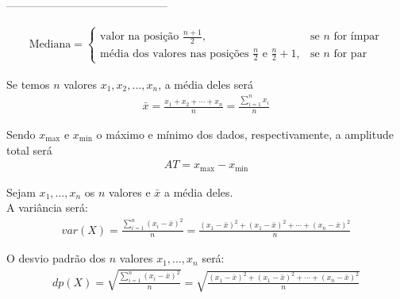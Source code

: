 \documentclass{article}
\begin{document}
\bigskip
--------------------------------------------

\begin{align*}
\text{Mediana} = \left\{\begin{array}{lc}
\text{valor na posição $\frac{n+1}{2}$}, & \text{se $n$ for ímpar} \\
\text{média dos valores nas posições $\frac{n}{2}$ e $\frac{n}{2}+1$}, & \text{se $n$ for par}
\end{array}\right.
\end{align*}

\begin{Huge}
\begin{center}
Se temos $n$ valores $x_1, x_2, \ldots, x_n$, a média deles será
\begin{align*}
\bar{x} = \frac{x_1 + x_2 + \cdots + x_n}{n} = \frac{\sum_{i=1}^n x_i}{n}
\end{align*}
\end{center}
\end{Huge}

\bigskip


\begin{Large}
\begin{center}
Sendo $x_{\max}$ e $x_{\min}$ o máximo e mínimo dos dados, respectivamente, a amplitude total será
\begin{align*}
AT = x_{\max} - x_{\min}
\end{align*}
\end{center}
\end{Large}


\bigskip


\begin{Large}
\begin{center}
Sejam $x_1, \ldots, x_n$ os $n$ valores e $\bar{x}$ a média deles. \\ A variância será:
\begin{align*}
var(X) = \frac{\sum_{i=1}^n (x_i - \bar{x})^2}{n} = \frac{(x_1 - \bar{x})^2 + (x_1 - \bar{x})^2 + \cdots + (x_n - \bar{x})^2}{n}
\end{align*}
\end{center}
\end{Large}


\bigskip


\begin{Large}
\begin{center}
O desvio padrão dos $n$ valores $x_1, \ldots, x_n$ será:
\begin{align*}
dp(X) = \sqrt{ \frac{\sum_{i=1}^n (x_i - \bar{x})^2}{n} } = \sqrt{ \frac{(x_1 - \bar{x})^2 + (x_1 - \bar{x})^2 + \cdots + (x_n - \bar{x})^2}{n} }
\end{align*}
\end{center}
\end{Large}
\end{document}
